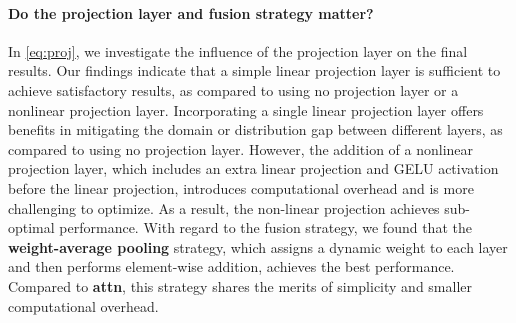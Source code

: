 \paragraph{Do the projection layer and fusion strategy matter?} In \autoref{eq:proj}, we investigate the influence of the projection layer on the final results. Our findings indicate that a simple linear projection layer is sufficient to achieve satisfactory results, as compared to using no projection layer or a nonlinear projection layer. Incorporating a single linear projection layer offers benefits in mitigating the domain or distribution gap between different layers, as compared to using no projection layer. However, the addition of a nonlinear projection layer, which includes an extra linear projection and GELU activation before the linear projection, introduces computational overhead and is more challenging to optimize. As a result, the non-linear projection achieves sub-optimal performance. With regard to the fusion strategy, we found that the \textbf{weight-average pooling} strategy, which assigns a dynamic weight to each layer and then performs element-wise addition, achieves the best performance. Compared to \textbf{attn}, this strategy shares the merits of simplicity and smaller computational overhead.
